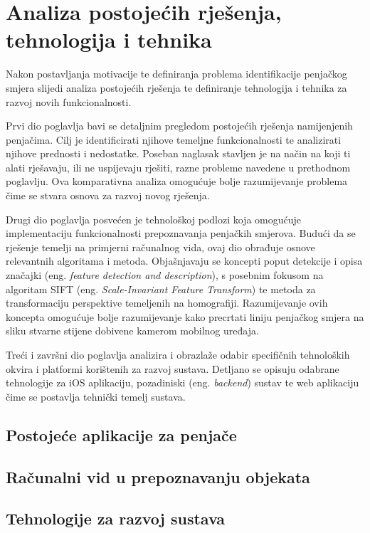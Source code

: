 \chapter{Analiza postojećih rješenja, tehnologija i tehnika}

Nakon postavljanja motivacije te definiranja problema identifikacije penjačkog smjera slijedi analiza postojećih rješenja te definiranje tehnologija i tehnika za razvoj novih funkcionalnosti. 

Prvi dio poglavlja bavi se detaljnim pregledom postojećih rješenja namijenjenih penjačima. Cilj je identificirati njihove temeljne funkcionalnosti te analizirati njihove prednosti i nedostatke. Poseban naglasak stavljen je na način na koji ti alati rješavaju, ili ne uspijevaju rješiti, razne probleme navedene u prethodnom poglavlju. Ova komparativna analiza omogućuje bolje razumijevanje problema čime se stvara osnova za razvoj novog rješenja.

Drugi dio poglavlja posvećen je tehnološkoj podlozi koja omogućuje implementaciju funkcionalnosti prepoznavanja penjačkih smjerova. Budući da se rješenje temelji na primjerni računalnog vida, ovaj dio obrađuje osnove relevantnih algoritama i metoda. Objašnjavaju se koncepti poput detekcije i opisa značajki (eng. \textit{feature detection and description}), s posebnim fokusom na algoritam SIFT (eng. \textit{Scale-Invariant Feature Transform}) te metoda za transformaciju perspektive temeljenih na homografiji. Razumijevanje ovih koncepta omogućuje bolje razumijevanje kako precrtati liniju penjačkog smjera na sliku stvarne stijene dobivene kamerom mobilnog uređaja.

Treći i završni dio poglavlja analizira i obrazlaže odabir specifičnih tehnoloških okvira i platformi korištenih za razvoj sustava. Detljano se opisuju odabrane tehnologije za iOS aplikaciju, pozadiniski (eng. \textit{backend}) sustav te web aplikaciju čime se postavlja tehnički temelj sustava.

\section{Postojeće aplikacije za penjače}



\section{Računalni vid u prepoznavanju objekata}





\section{Tehnologije za razvoj sustava}



 